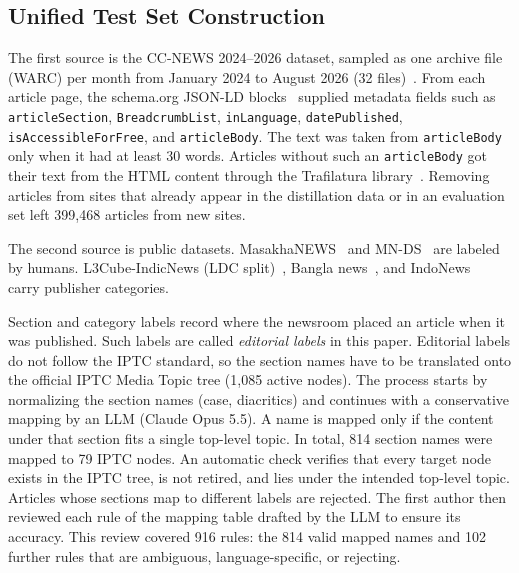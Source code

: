 \documentclass[journal]{IEEEtran}
\begin{document}
\subsection{Unified Test Set Construction}
\label{sec:testset}
The first source is the CC-NEWS 2024--2026 dataset, sampled as one archive file (WARC) per month from January 2024 to August 2026 (32 files)~\cite{commoncrawl2026ccnews}. From each article page, the schema.org JSON-LD blocks~\cite{guha2016schema} supplied metadata fields such as \texttt{articleSection}, \texttt{BreadcrumbList}, \texttt{inLanguage}, \texttt{datePublished}, \texttt{isAccessibleForFree}, and \texttt{articleBody}. The text was taken from \texttt{articleBody} only when it had at least 30 words. Articles without such an \texttt{articleBody} got their text from the HTML content through the Trafilatura library~\cite{barbaresi2021trafilatura}. Removing articles from sites that already appear in the distillation data or in an evaluation set left 399,468 articles from new sites.

The second source is public datasets. MasakhaNEWS~\cite{adelani2023masakhanews} and MN-DS~\cite{petukhova2023mnds} are labeled by humans. L3Cube-IndicNews (LDC split)~\cite{mirashi2023indicnews}, Bangla news~\cite{hossain2025banglanews}, and IndoNews~\cite{indonews2021} carry publisher categories.

Section and category labels record where the newsroom placed an article when it was published. Such labels are called \emph{editorial labels} in this paper. Editorial labels do not follow the IPTC standard, so the section names have to be translated onto the official IPTC Media Topic tree (1,085 active nodes). The process starts by normalizing the section names (case, diacritics) and continues with a conservative mapping by an LLM (Claude Opus 5.5). A name is mapped only if the content under that section fits a single top-level topic. In total, 814 section names were mapped to 79 IPTC nodes. An automatic check verifies that every target node exists in the IPTC tree, is not retired, and lies under the intended top-level topic. Articles whose sections map to different labels are rejected. The first author then reviewed each rule of the mapping table drafted by the LLM to ensure its accuracy. This review covered 916 rules: the 814 valid mapped names and 102 further rules that are ambiguous, language-specific, or rejecting.
\end{document}
